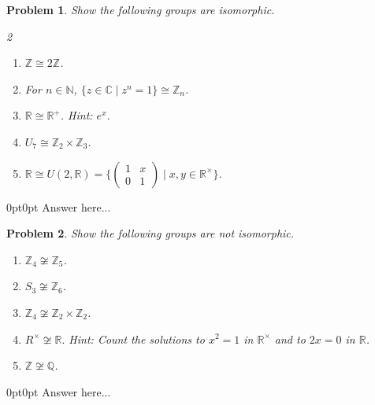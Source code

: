 \documentclass[12pt]{article}
\newcommand{\Z}{\mathbb{Z}}
\newcommand{\R}{\mathbb{R}}
\newcommand{\C}{\mathbb{C}}
\newcommand{\Q}{\mathbb{Q}}
\newcommand{\N}{\mathbb{N}}
\newtheorem{problem}{Problem}
\numberwithin{problem}{section} %
\theoremstyle{remark}  %
\newenvironment{answer}
    {\begin{adjustwidth}{0pt}{0pt}}
    {\end{adjustwidth}}
\begin{document}
    \begin{problem}
        Show the following groups are isomorphic.
        \begin{multicols}{2}
            \begin{enumerate}[label=(\alph*)]
                \item $\Z\cong 2\Z$.
                \item For $n\in\N$, $\{z\in\C \mid z^n=1\}\cong \Z_n$.
                \item $\R\cong \R^+$. Hint: $e^x$.
                \item $U_7\cong\Z_2\times\Z_3$.
                \item $\R\cong U(2,\R)=\{\begin{pmatrix}
                    1 & x \\
                    0 & 1
                \end{pmatrix} \mid x,y\in\R^\times\}$.
            \end{enumerate}
        \end{multicols}
    \end{problem}
    \begin{answer}
        Answer here...
    \end{answer}
    \begin{problem}
        Show the following groups are not isomorphic.
        \begin{enumerate}[label=(\alph*)]
            \item $\Z_4 \not\cong \Z_5$.
            \item $S_3 \not\cong \Z_6$.
            \item $\Z_4 \not\cong \Z_2\times\Z_2$.
            \item $R^\times \not\cong \R.$ Hint: Count the solutions to $x^2=1$ in $\R^\times$ and to $2x=0$ in $\R$.
            \item $\Z \not\cong \Q$.
        \end{enumerate}
    \end{problem}
    \begin{answer}
        Answer here...
    \end{answer}
\end{document}
